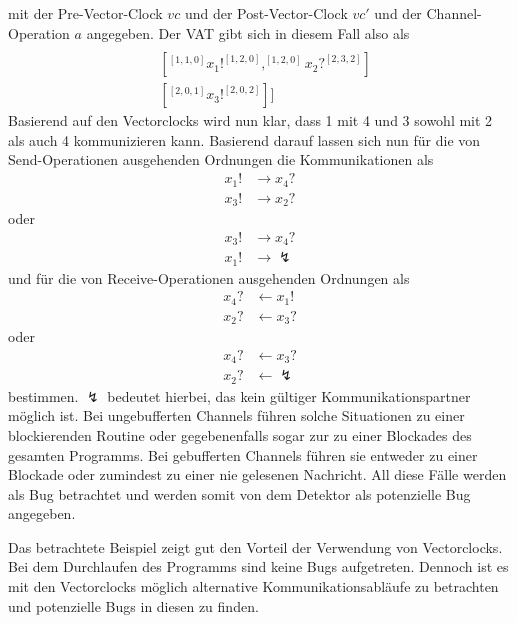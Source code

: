 mit der Pre-Vector-Clock $vc$ und der 
Post-Vector-Clock $vc'$ und der Channel-Operation $a$ angegeben.
Der VAT gibt sich in diesem Fall also als
\begin{align*}
  [&[^{[2,0,0]}x_4?^{[3,2,0]}]\\
  &[^{[1, 1, 0]}x_1!^{[1, 2, 0]}, ^{[1, 2, 0]}x_2?^{[2, 3, 2]}]\\
  &[^{[2, 0, 1]}x_3!^{[2, 0, 2]}]]
\end{align*}
Basierend auf den Vectorclocks wird nun klar, dass 1 mit 4 und 3 sowohl mit 
2 als auch 4 kommunizieren kann. Basierend darauf lassen sich nun für die 
von Send-Operationen ausgehenden Ordnungen die Kommunikationen als
  \begin{align*}
    x_1! &\to x_4?  \\
    x_3! &\to x_2?  
  \end{align*}
oder 
\begin{align*}
  x_3! &\to x_4?\\
  x_1! &\to \lightning
\end{align*}
und für die von Receive-Operationen ausgehenden Ordnungen als
  \begin{align*}
    x_4? &\leftarrow x_1!\\
    x_2? &\leftarrow x_3?
  \end{align*}
  oder 
  \begin{align*}
    x_4? &\leftarrow x_3?\\
    x_2? &\leftarrow \lightning
  \end{align*}
  bestimmen.
$\lightning$ bedeutet hierbei, das kein gültiger Kommunikationspartner möglich ist.
Bei ungebufferten Channels führen solche Situationen zu einer blockierenden Routine
oder gegebenenfalls sogar zur zu einer Blockades des gesamten Programms.
Bei gebufferten Channels führen sie entweder zu einer Blockade oder zumindest 
zu einer nie gelesenen Nachricht. All diese Fälle werden als Bug betrachtet
und werden somit von dem Detektor als potenzielle Bug angegeben.

Das betrachtete Beispiel zeigt gut den Vorteil der Verwendung von Vectorclocks.
Bei dem Durchlaufen des Programms sind keine Bugs aufgetreten. Dennoch 
ist es mit den Vectorclocks möglich alternative Kommunikationsabläufe 
zu betrachten und potenzielle Bugs in diesen zu finden.  

